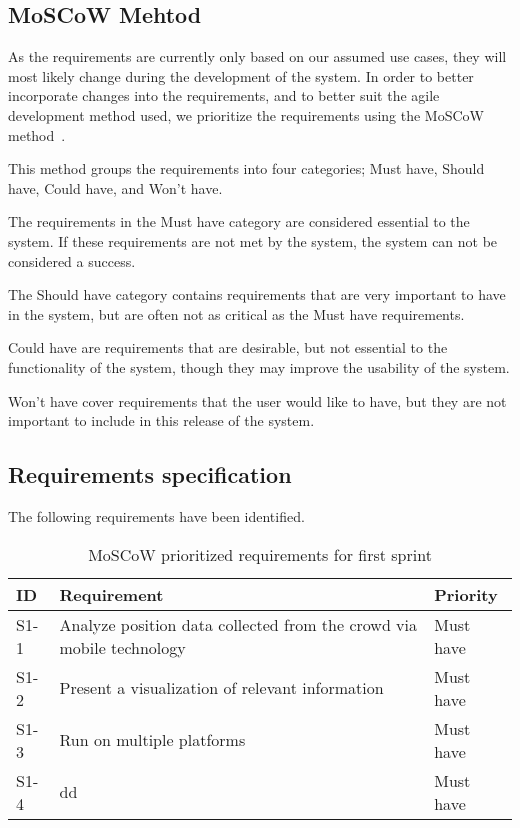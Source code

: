 \subsection{MoSCoW Mehtod}
As the requirements are currently only based on our assumed use cases, they will most likely change during the development of the system. In order to better incorporate changes into the requirements, and to better suit the agile development method used, we prioritize the requirements using the MoSCoW method~\cite{moscow}.

This method groups the requirements into four categories; Must have, Should have, Could have, and Won't have. 

The requirements in the Must have category are considered essential to the system. If these requirements are not met by the system, the system can not be considered a success. 

The Should have category contains requirements that are very important to have in the system, but are often not as critical as the Must have requirements. 

Could have are requirements that are desirable, but not essential to the functionality of the system, though they may improve the usability of the system. 

Won't have cover requirements that the user would like to have, but they are not important to include in this release of the system.

\subsection{Requirements specification}

The following requirements have been identified.

\begin{table}[h!]
	\centering
	\begin{tabularx}{\textwidth}{lXl}
		\toprule
		\textbf{ID} & \textbf{Requirement} & \textbf{Priority} \\
		\midrule 
		\rowcolor[HTML]{EFEFEF} 
		S1-1  & Analyze position data collected from the crowd via mobile technology    & Must have \\
		S1-2  & Present a visualization of relevant information                         & Must have \\
		\rowcolor[HTML]{EFEFEF} 
		S1-3  & Run on multiple platforms                                               & Must have \\
		S1-4  & dd                                                                      & Must have \\
		\bottomrule
	\end{tabularx}
	\caption{MoSCoW prioritized requirements for first sprint}
	\label{tab:s1_req}
\end{table}



